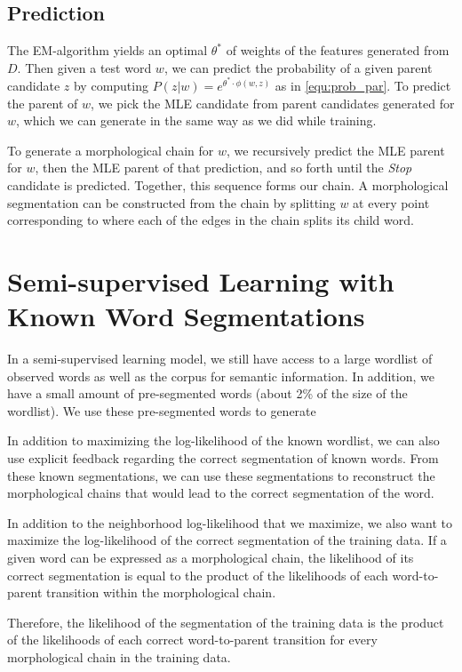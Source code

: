 \documentclass[11pt,twocolumn]{article}
\begin{document}
\subsection{Prediction}
The EM-algorithm yields an optimal $\theta^*$ of weights of the features generated from $D$. Then given a test word $w$, we can predict the probability of a given parent candidate $z$ by computing $P(z|w)=e^{\theta^*\cdot\phi(w,z)}$ as in \autoref{equ:prob_par}. To predict the parent of $w$, we pick the MLE candidate from parent candidates generated for $w$, which we can generate in the same way as we did while training.

To generate a morphological chain for $w$, we recursively predict the MLE parent for $w$, then the MLE parent of that prediction, and so forth until the \emph{Stop} candidate is predicted. Together, this sequence forms our chain. A morphological segmentation can be constructed from the chain by splitting $w$ at every point corresponding to where each of the edges in the chain splits its child word.

\section{Semi-supervised Learning with Known Word Segmentations}
In a semi-supervised learning model, we still have access to a large wordlist of observed words as well as the corpus for semantic information. In addition, we have a small amount of pre-segmented words (about 2\% of the size of the wordlist). We use these pre-segmented words to generate

In addition to maximizing the log-likelihood of the known wordlist,
we can also use explicit feedback regarding the correct segmentation of known words.
From these known segmentations, we can use these segmentations to reconstruct
the morphological chains that would lead to the correct segmentation of the word.

In addition to the neighborhood log-likelihood that we maximize,
we also want to maximize the log-likelihood of the correct segmentation of the training data.
If a given word can be expressed as a morphological chain, the likelihood of its correct segmentation
is equal to the product of the likelihoods of each word-to-parent transition within the morphological chain.

Therefore, the likelihood of the segmentation of the training data is the product of the likelihoods
of each correct word-to-parent transition for every morphological chain in the training data.
\end{document}
